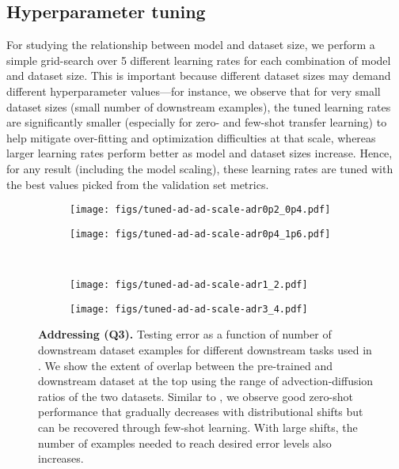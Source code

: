 \subsection{Hyperparameter tuning}
\label{sec:hpo}
For studying the relationship between model and dataset size, we perform a simple grid-search over 5 different learning
rates for each combination of model and dataset size.
This is important because different dataset sizes may demand different hyperparameter values---for instance, we observe that for very small dataset sizes (small number of downstream examples), the tuned learning rates are significantly smaller (especially for zero- and few-shot transfer learning) to help mitigate over-fitting and optimization difficulties at that scale, whereas larger learning rates perform better as model and dataset sizes increase. Hence, for any result (including the model scaling), these learning rates are tuned with the best values picked from the validation set metrics.

\begin{figure*}
\begin{subfigure}{.5\textwidth}
  \centering
  \texttt{[image: figs/tuned-ad-ad-scale-adr0p2\_0p4.pdf]}  
  \caption{\sysBzeropttwozeroptfour{}}
  \label{fig:ad-adr-0p2-0p4}
\end{subfigure}%
\begin{subfigure}{.5\textwidth}
  \centering
  \texttt{[image: figs/tuned-ad-ad-scale-adr0p4\_1p6.pdf]}  
  \caption{\sysBzeroptfouroneptsix{}}
  \label{fig:ad-adr-0p4-1p6}
\end{subfigure}\\
\begin{subfigure}{.5\textwidth}
  \centering
  \texttt{[image: figs/tuned-ad-ad-scale-adr1\_2.pdf]}  
  \caption{\sysBonetwo{}}
  \label{fig:ad-adr-1-2}
\end{subfigure}%
\begin{subfigure}{.5\textwidth}
  \centering
  \texttt{[image: figs/tuned-ad-ad-scale-adr3\_4.pdf]}  
  \caption{\sysBtwofive{}}
  \label{fig:ad-adr-2-5}
\end{subfigure}
\caption{\textbf{Addressing (Q3).} Testing error as a function of number of downstream dataset examples for different downstream tasks used in  \sysB{}. We show the extent of overlap between the pre-trained and downstream dataset at the top using the range of advection-diffusion ratios of the two datasets.
Similar to \sysA{}, we observe good zero-shot performance that gradually decreases with distributional shifts but can be recovered through few-shot learning. With large shifts, the number of examples needed to reach desired error levels also increases.
}%
\label{fig:sysB-physics-scaling}
\end{figure*}

